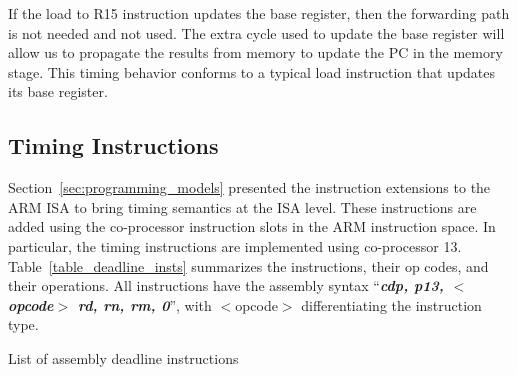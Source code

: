 If the load to R15 instruction updates the base register, then the forwarding path is not needed and not used. 
The extra cycle used to update the base register will allow us to propagate the results from memory to update the PC in the memory stage.
This timing behavior conforms to a typical load instruction that updates its base register. 

\subsection{Timing Instructions}
\label{sec:timing_inst_implementation}
Section~\ref{sec:programming_models} presented the instruction extensions to the ARM ISA to bring timing semantics at the ISA level.
These instructions are added using the co-processor instruction slots in the ARM instruction space. 
In particular, the timing instructions are implemented using co-processor 13.
Table~\ref{table_deadline_insts} summarizes the instructions, their op codes, and their operations.
All instructions have the assembly syntax ``\textbf{\textit{cdp, p13, $<$opcode$>$ rd, rn, rm, 0}}'', with $<$opcode$>$ differentiating the instruction type.
   
\begin{table}[h]
\noindent{}
\vspace{1mm}
\caption{List of assembly deadline instructions}
\label{table_deadline_insts}
\end{table}

